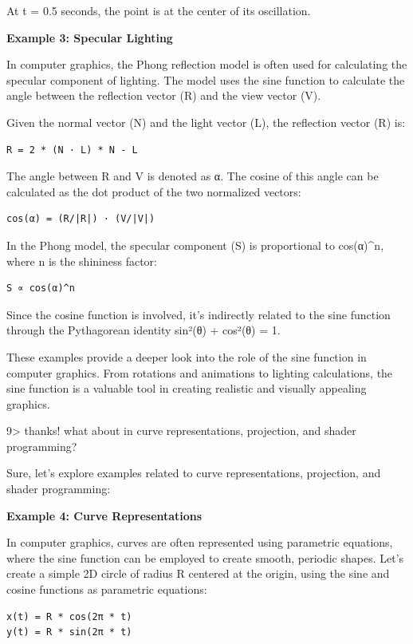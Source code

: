 \documentclass[
]{article}
\begin{document}
At t = 0.5 seconds, the point is at the center of its oscillation.

\textbf{Example 3: Specular Lighting}

In computer graphics, the Phong reflection model is often used for
calculating the specular component of lighting. The model uses the sine
function to calculate the angle between the reflection vector (R) and
the view vector (V).

Given the normal vector (N) and the light vector (L), the reflection
vector (R) is:

\begin{verbatim}
R = 2 * (N · L) * N - L
\end{verbatim}

The angle between R and V is denoted as α. The cosine of this angle can
be calculated as the dot product of the two normalized vectors:

\begin{verbatim}
cos(α) = (R/|R|) · (V/|V|)
\end{verbatim}

In the Phong model, the specular component (S) is proportional to
cos(α)\^{}n, where n is the shininess factor:

\begin{verbatim}
S ∝ cos(α)^n
\end{verbatim}

Since the cosine function is involved, it's indirectly related to the
sine function through the Pythagorean identity sin²(θ) + cos²(θ) = 1.

These examples provide a deeper look into the role of the sine function
in computer graphics. From rotations and animations to lighting
calculations, the sine function is a valuable tool in creating realistic
and visually appealing graphics.

9\textgreater{} thanks! what about in curve representations, projection,
and shader programming?

Sure, let's explore examples related to curve representations,
projection, and shader programming:

\textbf{Example 4: Curve Representations}

In computer graphics, curves are often represented using parametric
equations, where the sine function can be employed to create smooth,
periodic shapes. Let's create a simple 2D circle of radius R centered at
the origin, using the sine and cosine functions as parametric equations:

\begin{verbatim}
x(t) = R * cos(2π * t)
y(t) = R * sin(2π * t)
\end{verbatim}
\end{document}

